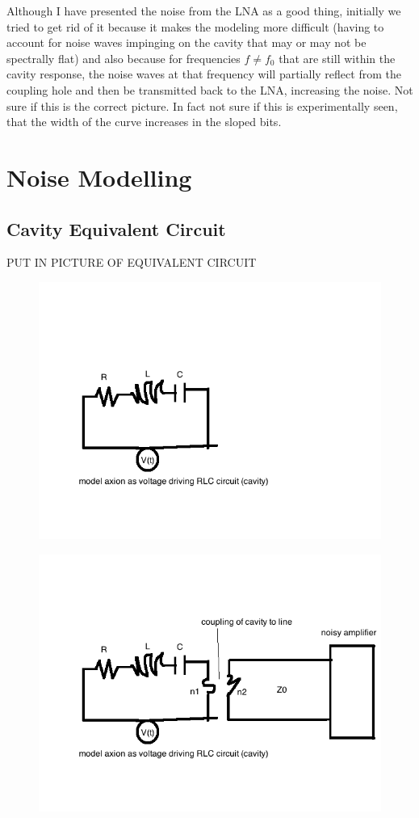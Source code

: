 \documentclass[11pt]{article}
\begin{document}
Although I have presented the noise from the LNA as a good thing, initially we tried to get rid of it because it makes the modeling more difficult (having to account for noise waves impinging on the cavity that may or may not be spectrally flat) and also because for frequencies $f \neq f_0$ that are still within the cavity response, the noise waves at that frequency will partially reflect from the coupling hole and then be transmitted back to the LNA, increasing the noise. Not sure if this is the correct picture. In fact not sure if this is experimentally seen, that the width of the curve increases in the sloped bits.

\section{Noise Modelling}
\subsection{Cavity Equivalent Circuit}
PUT IN PICTURE OF EQUIVALENT CIRCUIT
\begin{figure}
\includegraphics[scale=0.8]{RLCcircuit}
\end{figure}

\begin{figure}
\includegraphics[scale=0.8]{RLCcircuitNoisyAmplifier}
\end{figure} 
\end{document}
